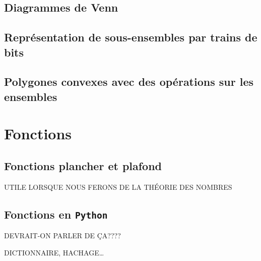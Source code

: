 \documentclass[
  letterpaper,
]{scrbook}
\theoremstyle{definition}
\theoremstyle{definition}
\theoremstyle{remark}
\begin{document}
\hypertarget{diagrammes-de-venn}{%
\section{Diagrammes de Venn}\label{diagrammes-de-venn}}

\hypertarget{repruxe9sentation-de-sous-ensembles-par-trains-de-bits}{%
\section{Représentation de sous-ensembles par trains de
bits}\label{repruxe9sentation-de-sous-ensembles-par-trains-de-bits}}

\hypertarget{polygones-convexes-avec-des-opuxe9rations-sur-les-ensembles}{%
\section{Polygones convexes avec des opérations sur les
ensembles}\label{polygones-convexes-avec-des-opuxe9rations-sur-les-ensembles}}


\hypertarget{fonctions}{%
\chapter{Fonctions}\label{fonctions}}

\hypertarget{fonctions-plancher-et-plafond}{%
\section{Fonctions plancher et
plafond}\label{fonctions-plancher-et-plafond}}

UTILE LORSQUE NOUS FERONS DE LA THÉORIE DES NOMBRES

\hypertarget{fonctions-en-python}{%
\section{\texorpdfstring{Fonctions en
\texttt{Python}}{Fonctions en Python}}\label{fonctions-en-python}}

DEVRAIT-ON PARLER DE ÇA????

DICTIONNAIRE, HACHAGE\ldots{}
\end{document}

